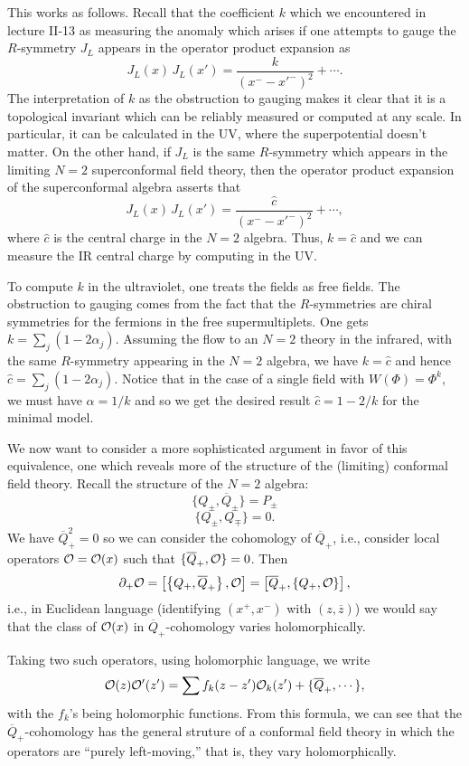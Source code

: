 This works as follows.  Recall that the coefficient $k$ which we encountered
in lecture II-13 as
measuring the anomaly which arises if one attempts to gauge the $R$-symmetry
$J_L$ appears in
the operator product expansion as
$$J_L(x)\,J_L(x')=\frac{k}{(x^--x'^-)^2}+\cdots .$$
The interpretation of $k$ as the obstruction to gauging makes it clear that it
is a topological
invariant which can be reliably measured or computed at any scale.
 In particular, it can be calculated in the UV, where the superpotential
doesn't matter.  On the other hand, if $J_L$ is the same $R$-symmetry which
appears in
the limiting $N=2$
superconformal field theory, then the  operator product expansion of the
superconformal algebra
asserts that
$$J_L(x)\,J_L(x')=\frac{\widehat{c}}{(x^--x'^-)^2}+\cdots ,$$
where $\widehat{c}$ is the central charge in the $N=2$ algebra.
Thus, $k=\widehat{c}$ and we can measure the IR
central charge by computing in the UV.



To compute $k$ in the ultraviolet, one treats the fields as free fields.
The obstruction to gauging comes from the fact that the $R$-symmetries are
chiral symmetries for the fermions in the free supermultiplets.
One gets $k=\sum_j(1-2\alpha_j)$.
Assuming the flow to an $N=2$ theory in the infrared, with the same
$R$-symmetry appearing
in the $N=2$ algebra, we have $k=\widehat c$ and hence $\widehat
c=\sum_j(1-2\alpha_j)$.
Notice
that in the case of a single field with $W(\Phi)=\Phi^k$, we must have
$\alpha=1/k$ and so we
get the desired result $\widehat{c}=1-2/k$ for the minimal model.

We now want to consider  a more sophisticated argument in favor of this
equivalence, one
which reveals more of the structure of the (limiting) conformal field theory.
Recall the
structure of the $N{=}2$ algebra:
$$\{Q_\pm,\overline{Q}_\pm\}=P_\pm$$
$$\{Q_\pm,Q_\mp\}=0.$$
We have $\overline{Q}_+^2=0$ so we can consider the cohomology of
$\overline{Q}_+$, i.e., consider
local operators ${\cal O}={\cal O}(x)$ such that $\{\overline{Q}_+,{\cal
O}\}=0$.  Then
$$\partial_+{\cal O}=\left[\left\{Q_+,\overline{Q}_+\right\},{\cal O}\right]
=\left[\overline{Q}_+,\left\{Q_+,{\cal O}\right\}\right],$$
i.e., in Euclidean language (identifying $(x^+,x^-)$ with $(z,\overline{z})$)
we would say that
the class of
${\cal O}(x)$ in $\overline{Q}_+$-cohomology varies holomorphically.

Taking two such operators, using holomorphic language, we write
$${\cal O}(z){\cal O}'(z')=\sum f_k(z-z'){\cal O}_k(z')+\{\overline{Q}_+,\cdots
\},$$
with the $f_k$'s being holomorphic functions.  From this formula, we can see
that the
$\overline{Q}_+$-cohomology has the general struture of a conformal field
theory in which
the operators are ``purely left-moving,'' that is, they vary holomorphically.


